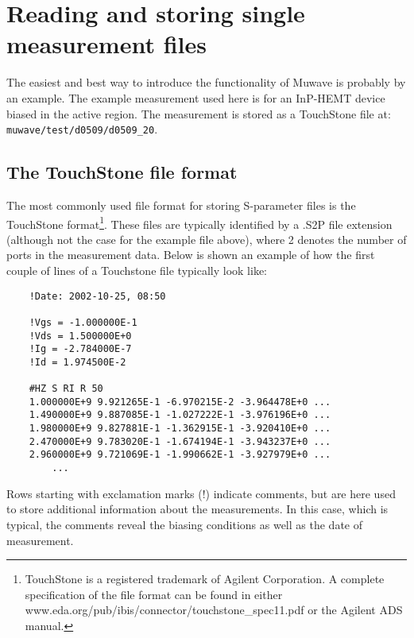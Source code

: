 %
\section{Reading and storing single measurement files}
The easiest and best way to introduce the functionality of Muwave
is probably by an example. The example measurement used here is
for an InP-HEMT device biased in the active region. The
measurement is stored as a TouchStone file at: \newline
\verb"muwave/test/d0509/d0509_20".

\subsection{The TouchStone file format}
The most commonly used file format for storing S-parameter files
is the TouchStone format\footnote{TouchStone is a registered
trademark of Agilent Corporation. A complete specification of the
file format can be found in either
www.eda.org/pub/ibis/connector/touchstone\_spec11.pdf or the
Agilent ADS manual.}. These files are typically identified by a
.S2P file extension (although not the case for the example file
above), where 2 denotes the number of ports in the measurement
data. Below is shown an example of how the first couple of lines
of a Touchstone file typically look like:
\begin{small}
\begin{verbatim}
    !Date: 2002-10-25, 08:50

    !Vgs = -1.000000E-1
    !Vds = 1.500000E+0
    !Ig = -2.784000E-7
    !Id = 1.974500E-2

    #HZ S RI R 50
    1.000000E+9 9.921265E-1 -6.970215E-2 -3.964478E+0 ...
    1.490000E+9 9.887085E-1 -1.027222E-1 -3.976196E+0 ...
    1.980000E+9 9.827881E-1 -1.362915E-1 -3.920410E+0 ...
    2.470000E+9 9.783020E-1 -1.674194E-1 -3.943237E+0 ...
    2.960000E+9 9.721069E-1 -1.990662E-1 -3.927979E+0 ...
        ...
\end{verbatim}
\end{small}
Rows starting with exclamation marks (!) indicate comments, but
are here used to store additional information about the
measurements. In this case, which is typical, the comments reveal
the biasing conditions as well as the date of measurement.

